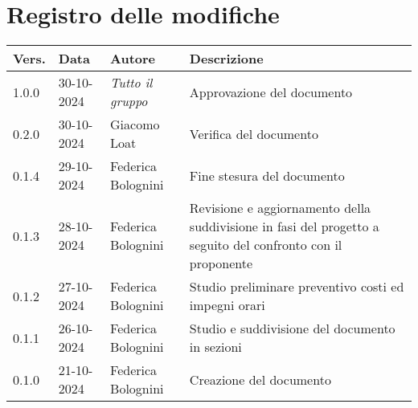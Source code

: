 \section*{Registro delle modifiche}

\begin{table}[h]
    \centering
    \begin{tabular}{|l|l|l|p{5cm}|}
        \hline
        \rowcolor[gray]{0.9}
        \textbf{Vers.} & \textbf{Data} & \textbf{Autore} & \textbf{Descrizione}\\
        \hline
        1.0.0 & 30-10-2024 & \emph{Tutto il gruppo} & Approvazione del documento\\
        \hline
        0.2.0 & 30-10-2024 & Giacomo Loat & Verifica del documento\\
        \hline
        0.1.4 & 29-10-2024 & Federica Bolognini & Fine stesura del documento\\
        \hline
        0.1.3 & 28-10-2024 & Federica Bolognini & Revisione e aggiornamento della suddivisione in fasi del progetto a seguito del confronto con il proponente\\
        \hline
        0.1.2 & 27-10-2024 & Federica Bolognini & Studio preliminare preventivo costi ed impegni orari\\
        \hline
        0.1.1 & 26-10-2024 & Federica Bolognini & Studio e suddivisione del documento in sezioni\\
        \hline
        0.1.0 & 21-10-2024 & Federica Bolognini & Creazione del documento\\
        \hline
    \end{tabular}
\end{table}
